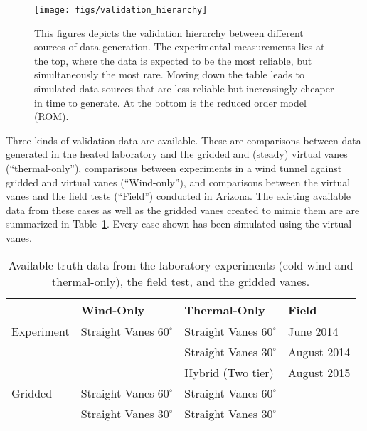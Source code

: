 %
%
 \begin{figure}[!htb]
   \begin{center}
    \texttt{[image: figs/validation\_hierarchy]}
    \caption{This figures depicts the validation hierarchy between
    different sources of data generation. The experimental measurements
    lies at the top, where the data is expected to be the most reliable,
    but simultaneously the most rare. Moving down the table leads to
    simulated data sources that are less reliable but increasingly
    cheaper in time to generate. At the bottom is the reduced order
    model (ROM).} 
    \label{fig:val_hier}
   \end{center}
 \end{figure}

Three kinds of validation data are available. These are comparisons
between data generated in the heated laboratory and the gridded and
(steady) virtual vanes (``thermal-only''), comparisons between
experiments in a wind tunnel against gridded and virtual vanes
(``Wind-only''), and comparisons between the virtual vanes and the field
tests (``Field'') conducted in Arizona. The existing available data from
these cases as well as the gridded vanes created to mimic them are are
summarized in Table~\ref{tab:val_data}. Every case shown has been
simulated using the virtual vanes.   

\large
\begin{table}[h]
\centering
\label{my-label}
\begin{tabular}{l|l|l|l|}
           & Wind-Only                   & Thermal-Only                & Field  \\
  \hline 
Experiment & Straight Vanes $60^{\circ}$ & Straight Vanes $60^{\circ}$ & June 2014   \\
           &                           & Straight Vanes $30^{\circ}$   & August 2014 \\
           &                           & Hybrid (Two tier)             & August 2015 \\
  \hline 
Gridded    & Straight Vanes $60^{\circ}$ & Straight Vanes $60^{\circ}$ & \\
           & Straight Vanes $30^{\circ}$ & Straight Vanes $30^{\circ}$ & \\
  \hline 
\end{tabular}
  \caption{Available truth data from the laboratory experiments 
    (cold wind and thermal-only), the field test, and the gridded vanes.} 
  \label{tab:val_data}
\end{table}
%
%
%
%
%

